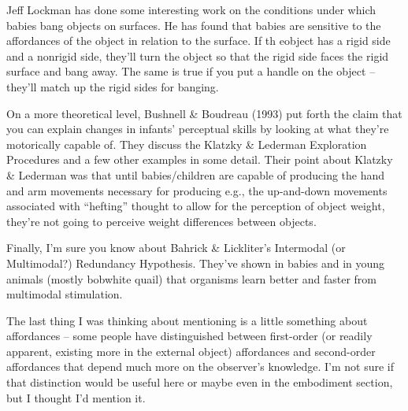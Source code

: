 Jeff Lockman has done some interesting work on the conditions under which babies bang objects on surfaces.  He has found that babies are sensitive to the affordances of the object in relation to the surface.  If th eobject has a rigid side and a nonrigid side, they'll turn the object so that the rigid side faces the rigid surface and bang away.  The same is true if you  put a handle on the object -- they'll match up the rigid sides for banging.



On a more theoretical level, Bushnell \& Boudreau (1993) put forth the claim that you can explain changes in infants' perceptual skills by looking at what they're motorically capable of.  They discuss the Klatzky \& Lederman Exploration Procedures and a few other examples in some detail.  Their point about Klatzky \& Lederman was that until babies/children are capable of producing the hand and arm movements necessary for producing e.g., the up-and-down movements associated with ``hefting'' thought to allow for the perception of object weight, they're not going to perceive weight differences between objects.   

Finally, I'm sure you know about Bahrick \& Lickliter's Intermodal (or Multimodal?) Redundancy Hypothesis.  They've shown in babies and in young animals (mostly bobwhite quail) that organisms learn better and faster from multimodal stimulation.  



The last thing I was thinking about mentioning is a little something about affordances -- some people have distinguished between first-order (or readily apparent, existing more in the external object) affordances and second-order affordances that depend much more on the observer's knowledge.  I'm not sure if that distinction would be useful here or maybe even in the embodiment section, but I thought I'd mention it.
